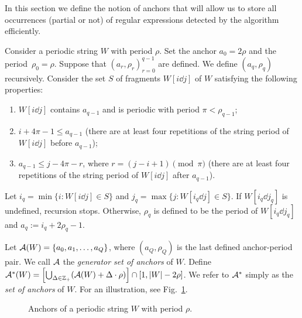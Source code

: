 In this section we define the notion of anchors that will allow us to store all occurrences (partial or not) of regular expressions detected by the algorithm efficiently. 


\begin{definition}[Anchors]\label{def:anchors}
Consider a periodic string $W$ with period $\rho$. Set the anchor $a_0 = 2\rho$ and the period~$\rho_0 = \rho$. Suppose that $(a_r, \rho_r)_{r = 0}^{q-1}$ are defined. We define $(a_{q}, \rho_{q})$ recursively. Consider the set $S$ of fragments $W[i \dd j]$ of $W$ satisfying the following properties:
\begin{enumerate}
\item $W[i \dd j]$ contains $a_{q-1}$ and is periodic with period $\pi < \rho_{q-1}$;
\item $i+4\pi-1 \le a_{q-1}$ (there are at least four repetitions of the string period of $W[i \dd j]$ before $a_{q-1}$);
\item $a_{q-1} \le j-4\pi-r$, where $r = (j-i+1) \pmod \pi$ (there are at least four repetitions of the string period of $W[i \dd j]$ after $a_{q-1}$).
\end{enumerate}
Let $i_q = \min\{i : W[i\dd j] \in S\}$ and $j_q = \max\{j : W[i_q\dd j] \in S\}$. If $W[i_{q} \dd j_{q}]$ is undefined, recursion stops. Otherwise, $\rho_q$ is defined to be the period of $W[i_q \dd j_q]$ and $a_{q} := i_{q}+2\rho_{q}-1$. 

Let $\mathcal{A}(W) = \{a_0, a_1, \ldots, a_{Q}\}$, where $(a_Q,\rho_Q)$ is the last defined anchor-period pair. We call $\mathcal{A}$ the \emph{generator set of anchors} of $W$. Define $\mathcal{A}^\ast(W) = \left[\bigcup_{\Delta \in \mathbb{Z}_+} (\mathcal{A}(W) + \Delta \cdot \rho)\right] \cap [1, |W|-2\rho]$. We refer to $\mathcal{A}^\ast$ simply as the \emph{set of anchors} of $W$. For an illustration, see Fig.~\ref{fig:anchors}.
\end{definition}

\begin{figure}[ht!]
\caption{Anchors of a periodic string $W$ with period $\rho$.}
\label{fig:anchors}
\end{figure}


